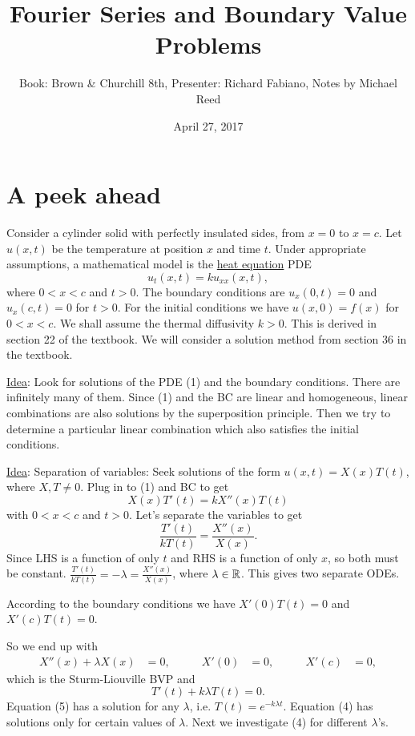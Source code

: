 \documentclass[]{article}
\author{Book: Brown \& Churchill 8th, Presenter: Richard Fabiano, Notes by Michael Reed}
\title{Fourier Series and Boundary Value Problems}
\date{April 27, 2017}
\begin{document}
\maketitle

\section{A peek ahead}

Consider a cylinder solid with perfectly insulated sides, from $x=0$ to $x=c$. Let $u(x,t)$ be the temperature at position $x$ and time $t$. Under appropriate assumptions, a mathematical model is the \underline{heat equation} PDE
\begin{equation}
	u_t(x,t)=k u_{xx}(x,t),
\end{equation}
where $0<x<c$ and $t>0$. The boundary conditions are $u_x(0,t)=0$ and $u_x(c,t)=0$ for $t>0$. For the initial conditions we have $u(x,0)=f(x)$ for $0<x<c$. We shall assume the thermal diffusivity $k>0$.
This is derived in section 22 of the textbook. We will consider a solution method from section 36 in the textbook.

\underline{Idea}: Look for solutions of the PDE (1) and the boundary conditions. There are infinitely many of them. Since (1) and the BC are linear and homogeneous, linear combinations are also solutions by the superposition principle. Then we try to determine a particular linear combination which also satisfies the initial conditions.

\underline{Idea}: Separation of variables: Seek solutions of the form $u(x,t)=X(x)T(t)$, where $X,T\neq 0$. Plug in to (1) and BC to get
\begin{equation}
X(x)T'(t)=kX''(x)T(t)
\end{equation}
with $0<x<c$ and $t>0$. Let's separate the variables to get
\begin{equation}
\frac{T'(t)}{kT(t)}=\frac{X''(x)}{X(x)}.
\end{equation}
Since LHS is a function of only $t$ and RHS is a function of only $x$, so both must be constant. $\frac{T'(t)}{kT(t)}=-\lambda=\frac{X''(x)}{X(x)}$, where $\lambda\in\mathbb{R}$. This gives two separate ODEs.
\begin{note}
	According to the boundary conditions we have $X'(0)T(t)=0$ and $X'(c)T(t)=0$.
\end{note}
So we end up with
\begin{align}
X''(x)+\lambda X(x)&=0, &\qquad
X'(0)&=0, &\qquad X'(c)&=0,
\end{align}
which is the Sturm-Liouville BVP and
\begin{equation}
T'(t)+k\lambda T(t)=0.
\end{equation}
Equation (5) has a solution for any $\lambda$, i.e. $T(t)=e^{-k\lambda t}$. Equation (4) has solutions only for certain values of $\lambda$. Next we investigate (4) for different $\lambda$'s.
\end{document}
